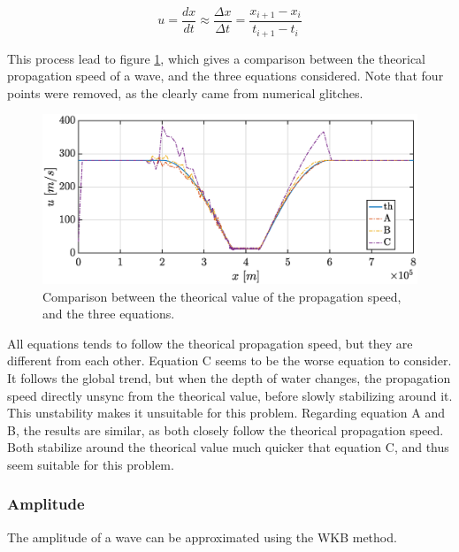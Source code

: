 \documentclass[a4paper,12pt,twoside]{article}
\begin{document}
        \begin{equation}
          u=\frac{dx}{dt}\approx\frac{\Delta x}{\Delta t}=\frac{x_{i+1} - x_i}{t_{i+1} - t_i}
          \label{eq:DFM-u}
        \end{equation}

        This process lead to figure \ref{fig:tsunami_speed}, which gives a comparison between the theorical propagation speed of a wave, and the three equations considered.
        Note that four points were removed, as the clearly came from numerical glitches.

        \begin{figure}[h]
          \centering
          \includegraphics[width=\textwidth]{graphs/tsunami_speed.eps}
          \caption{Comparison between the theorical value of the propagation speed, and the three equations.}
          \label{fig:tsunami_speed}
        \end{figure}

        All equations tends to follow the theorical propagation speed, but they are different from each other.
        Equation C seems to be the worse equation to consider.
        It follows the global trend, but when the depth of water changes, the propagation speed directly unsync from the theorical value, before slowly stabilizing around it.
        This unstability makes it unsuitable for this problem.
        Regarding equation A and B, the results are similar, as both closely follow the theorical propagation speed.
        Both stabilize around the theorical value much quicker that equation C, and thus seem suitable for this problem.

      \subsubsection{Amplitude}
      The amplitude of a wave can be approximated using the WKB method.
\end{document}
